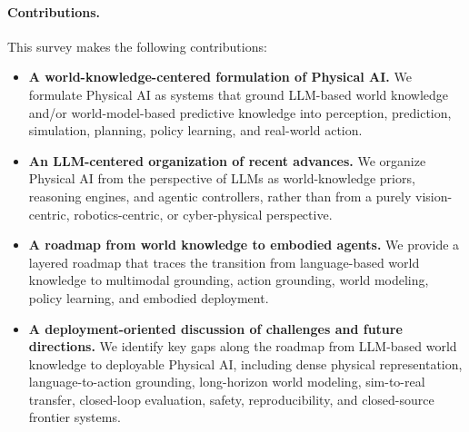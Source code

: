 \paragraph{Contributions.}
This survey makes the following contributions:
\begin{itemize}
    \item \textbf{A world-knowledge-centered formulation of Physical AI.}
    We formulate Physical AI as systems that ground LLM-based world knowledge and/or world-model-based predictive knowledge into perception, prediction, simulation, planning, policy learning, and real-world action.

    \item \textbf{An LLM-centered organization of recent advances.}
    We organize Physical AI from the perspective of LLMs as world-knowledge priors, reasoning engines, and agentic controllers, rather than from a purely vision-centric, robotics-centric, or cyber-physical perspective.

    \item \textbf{A roadmap from world knowledge to embodied agents.}
    We provide a layered roadmap that traces the transition from language-based world knowledge to multimodal grounding, action grounding, world modeling, policy learning, and embodied deployment.

    \item \textbf{A deployment-oriented discussion of challenges and future directions.}
    We identify key gaps along the roadmap from LLM-based world knowledge to deployable Physical AI, including dense physical representation, language-to-action grounding, long-horizon world modeling, sim-to-real transfer, closed-loop evaluation, safety, reproducibility, and closed-source frontier systems.
\end{itemize}





